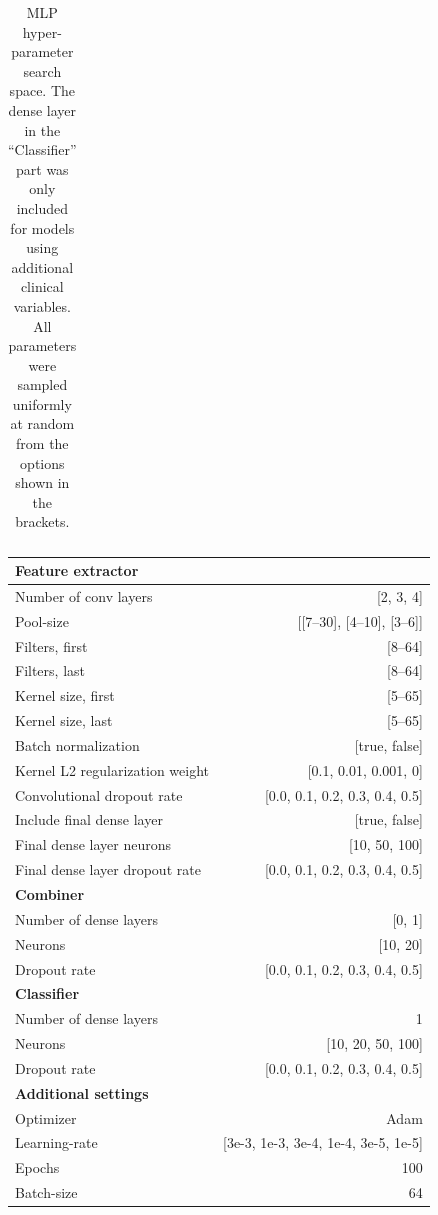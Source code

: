 \documentclass[preprint]{elsarticle}
\begin{document}
\begin{table}[H]
\begin{adjustbox}{center}
\begin{tabular}{@{}lr@{}}
\bottomrule
\end{tabular}
\end{adjustbox}
\caption{MLP hyper-parameter search space. The dense layer in the ``Classifier'' part was only included for models using additional clinical variables. All parameters were sampled uniformly at random from the options shown in the brackets.}
\label{table:mlp}
\end{table}
\renewcommand{\arraystretch}{1}


\renewcommand{\arraystretch}{1.2}
\begin{table}[H]
  \centering
  \scriptsize
\begin{adjustbox}{center}
\begin{tabular}{@{}lr@{}}
\toprule
\textbf{Feature extractor}  & \\
\midrule
{Number of conv layers}     & [2, 3, 4] \\
{Pool-size}                 & [[7--30], [4--10], [3--6]] \\
{Filters, first}            & [8--64] \\
{Filters, last}             & [8--64] \\
{Kernel size, first}        & [5--65] \\
{Kernel size, last}         & [5--65] \\
{Batch normalization}       & [true, false] \\
{Kernel L2 regularization weight}              & [0.1, 0.01, 0.001, 0] \\
{Convolutional dropout rate}                  & [0.0, 0.1, 0.2, 0.3, 0.4, 0.5] \\
{Include final dense layer}    & [true, false] \\
{Final dense layer neurons}                   & [10, 50, 100] \\
{Final dense layer dropout rate}             & [0.0, 0.1, 0.2, 0.3, 0.4, 0.5] \\
\midrule
\textbf{Combiner}           & \\
\midrule
{Number of dense layers}    & [0, 1] \\
{Neurons}                   & [10, 20] \\
{Dropout rate}                  & [0.0, 0.1, 0.2, 0.3, 0.4, 0.5] \\
\midrule
\textbf{Classifier}         & \\
\midrule
{Number of dense layers}    & 1 \\
{Neurons}                   & [10, 20, 50, 100] \\
{Dropout rate}                  & [0.0, 0.1, 0.2, 0.3, 0.4, 0.5] \\
\midrule
\textbf{Additional settings} & \\
\midrule
Optimizer                   & Adam \\
Learning-rate               & [3e-3, 1e-3, 3e-4, 1e-4, 3e-5, 1e-5] \\
Epochs                      & 100 \\
Batch-size                  & 64 \\


\end{tabular}
\end{adjustbox}
\end{table}
\end{document}

